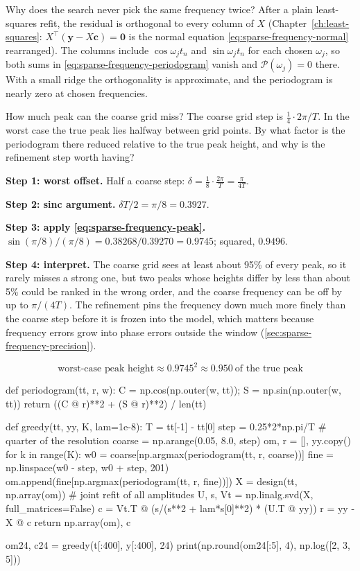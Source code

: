 Why does the search never pick the same frequency twice? After a plain least-squares refit, the residual is orthogonal to every column of $X$ (Chapter~\ref{ch:least-squares}: $X^\top(\bm y-X\bm c)=\bm 0$ is the normal equation \eqref{eq:sparse-frequency-normal} rearranged). The columns include $\cos\omega_jt_n$ and $\sin\omega_jt_n$ for each chosen $\omega_j$, so both sums in \eqref{eq:sparse-frequency-periodogram} vanish and $\mathcal P(\omega_j)=0$ there. With a small ridge the orthogonality is approximate, and the periodogram is nearly zero at chosen frequencies.

\begin{sample}{How much peak can the coarse grid miss?}
The coarse grid step is $\tfrac14\cdot2\pi/T$. In the worst case the true peak lies halfway between grid points. By what factor is the periodogram there reduced relative to the true peak height, and why is the refinement step worth having?

\textbf{Step 1: worst offset.} Half a coarse step: $\delta=\tfrac18\cdot\frac{2\pi}{T}=\frac{\pi}{4T}$.

\textbf{Step 2: sinc argument.} $\delta T/2=\pi/8=0.3927$.

\textbf{Step 3: apply \eqref{eq:sparse-frequency-peak}.} $\sin(\pi/8)/(\pi/8)=0.38268/0.39270=0.9745$; squared, $0.9496$.

\textbf{Step 4: interpret.} The coarse grid sees at least about 95\% of every peak, so it rarely misses a strong one, but two peaks whose heights differ by less than about 5\% could be ranked in the wrong order, and the coarse frequency can be off by up to $\pi/(4T)$. The refinement pins the frequency down much more finely than the coarse step before it is frozen into the model, which matters because frequency errors grow into phase errors outside the window (\cref{sec:sparse-frequency-precision}).

$$\boxed{\text{worst-case peak height}\approx0.9745^2\approx0.950\ \text{of the true peak}}$$
\end{sample}

\begin{pycode}
def periodogram(tt, r, w):
    C = np.cos(np.outer(w, tt)); S = np.sin(np.outer(w, tt))
    return ((C @ r)**2 + (S @ r)**2) / len(tt)

def greedy(tt, yy, K, lam=1e-8):
    T = tt[-1] - tt[0]
    step = 0.25*2*np.pi/T                        # quarter of the resolution
    coarse = np.arange(0.05, 8.0, step)
    om, r = [], yy.copy()
    for k in range(K):
        w0 = coarse[np.argmax(periodogram(tt, r, coarse))]
        fine = np.linspace(w0 - step, w0 + step, 201)
        om.append(fine[np.argmax(periodogram(tt, r, fine))])
        X = design(tt, np.array(om))             # joint refit of all amplitudes
        U, s, Vt = np.linalg.svd(X, full_matrices=False)
        c = Vt.T @ (s/(s**2 + lam*s[0]**2) * (U.T @ yy))
        r = yy - X @ c
    return np.array(om), c

om24, c24 = greedy(t[:400], y[:400], 24)
print(np.round(om24[:5], 4), np.log([2, 3, 5]))
\end{pycode}

